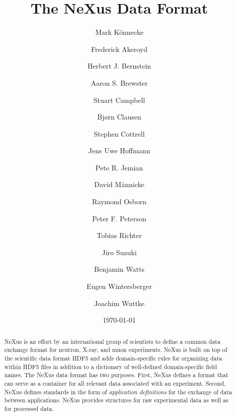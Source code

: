 \documentclass[%
 aip,
rsi,
 amsmath,amssymb,
 reprint,%
]{revtex4-1}
\begin{document}

\title{The NeXus Data Format}


\author{Mark K\"onnecke}

\author{Frederick Akeroyd}

\author{Herbert J. Bernstein}

\author{Aaron S. Brewster}

\author{Stuart Campbell}

\author{Bj{\o}rn Clausen}

\author{Stephen Cottrell}

\author{Jens Uwe Hoffmann}

\author{Pete R. Jemian}

\author{David M\"annicke}

\author{Raymond Osborn}

\author{Peter F. Peterson}

\author{Tobias Richter}

\author{Jiro Suzuki}

\author{Benjamin Watts}

\author{Eugen Wintersberger}

\author{Joachim Wuttke}



\date{\today}%

\begin{abstract}
NeXus is an effort by an international group of scientists to define 
 a common data exchange format for neutron, X-ray, and muon experiments.   
NeXus is built on top of the scientific data format HDF5 and adds 
domain-specific 
rules for organizing data within HDF5 files in addition to a dictionary of well-defined 
domain-specific field names. The NeXus data format has two purposes.  First, NeXus defines a
format that can serve as a container for all relevant data associated
with an experiment. Second, NeXus
defines standards in the form of \emph{application definitions} for the
exchange of data between applications.  NeXus provides structures for raw experimental data as well as for processed data.  
\end{abstract}
\end{document}
